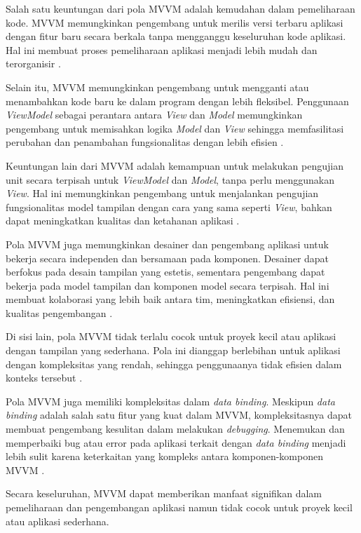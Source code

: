 \documentclass[conference]{IEEEtran}
\begin{document}
	Salah satu keuntungan dari pola MVVM adalah kemudahan dalam pemeliharaan kode. MVVM memungkinkan pengembang untuk merilis versi terbaru aplikasi dengan fitur baru secara berkala tanpa mengganggu keseluruhan kode aplikasi. Hal ini membuat proses pemeliharaan aplikasi menjadi lebih mudah dan terorganisir \cite{Martin2024}.
	
	Selain itu, MVVM memungkinkan pengembang untuk mengganti atau menambahkan kode baru ke dalam program dengan lebih fleksibel. Penggunaan \textit{ViewModel} sebagai perantara antara \textit{View} dan \textit{Model} memungkinkan pengembang untuk memisahkan logika \textit{Model} dan \textit{View} sehingga memfasilitasi perubahan dan penambahan fungsionalitas dengan lebih efisien \cite{michael2023}.
	
	Keuntungan lain dari MVVM adalah kemampuan untuk melakukan pengujian unit secara terpisah untuk \textit{ViewModel} dan \textit{Model}, tanpa perlu menggunakan \textit{View}. Hal ini memungkinkan pengembang untuk menjalankan pengujian fungsionalitas model tampilan dengan cara yang sama seperti \textit{View}, bahkan dapat meningkatkan kualitas dan ketahanan aplikasi \cite{michael2023}.
	
	Pola MVVM juga memungkinkan desainer dan pengembang aplikasi untuk bekerja secara independen dan bersamaan pada komponen. Desainer dapat berfokus pada desain tampilan yang estetis, sementara pengembang dapat bekerja pada model tampilan dan komponen model secara terpisah. Hal ini membuat kolaborasi yang lebih baik antara tim, meningkatkan efisiensi, dan kualitas pengembangan \cite{michael2023}. 
	
	Di sisi lain, pola MVVM tidak terlalu cocok untuk proyek kecil atau aplikasi dengan tampilan yang sederhana. Pola ini dianggap berlebihan untuk aplikasi dengan kompleksitas yang rendah, sehingga penggunaanya tidak efisien dalam konteks tersebut \cite{Maulana2022}.
	
	Pola MVVM juga memiliki kompleksitas dalam \textit{data binding}. Meskipun \textit{data binding} adalah salah satu fitur yang kuat dalam MVVM, kompleksitasnya dapat membuat pengembang kesulitan dalam melakukan \textit{debugging}. Menemukan dan memperbaiki bug atau error pada aplikasi terkait dengan \textit{data binding} menjadi lebih sulit karena keterkaitan yang kompleks antara komponen-komponen MVVM \cite{Maulana2022}.
	
	Secara keseluruhan, MVVM dapat memberikan manfaat signifikan dalam pemeliharaan dan pengembangan aplikasi namun tidak cocok untuk proyek kecil atau aplikasi sederhana.
	
\end{document}
